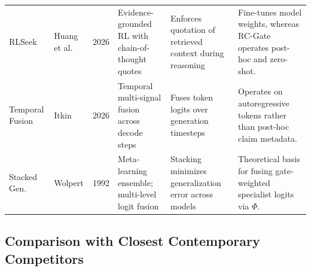 \documentclass[pdflatex,sn-mathphys,Numbered]{sn-jnl}
\begin{document}
\begin{table}[htbp]
\begin{tabular}{@{}p{2.2cm}p{1.6cm}cp{2.2cm}p{2.6cm}p{2.8cm}@{}}
\addlinespace
RLSeek~\cite{huang2026rlseek} & Huang et al. & 2026 & Evidence-grounded RL with chain-of-thought quotes & Enforces quotation of retrieved context during reasoning & Fine-tunes model weights, whereas RC-Gate operates post-hoc and zero-shot. \\
\addlinespace
Temporal Fusion~\cite{itkin2026temporal} & Itkin & 2026 & Temporal multi-signal fusion across decode steps & Fuses token logits over generation timesteps & Operates on autoregressive tokens rather than post-hoc claim metadata. \\
\addlinespace
Stacked Gen.~\cite{wolpert1992stacked} & Wolpert & 1992 & Meta-learning ensemble; multi-level logit fusion & Stacking minimizes generalization error across models & Theoretical basis for fusing gate-weighted specialist logits via $\Phi$. \\
\bottomrule
\end{tabular}
\end{table}

\subsection{Comparison with Closest Contemporary Competitors}\label{subsec:competitor_comparison}
\end{document}
